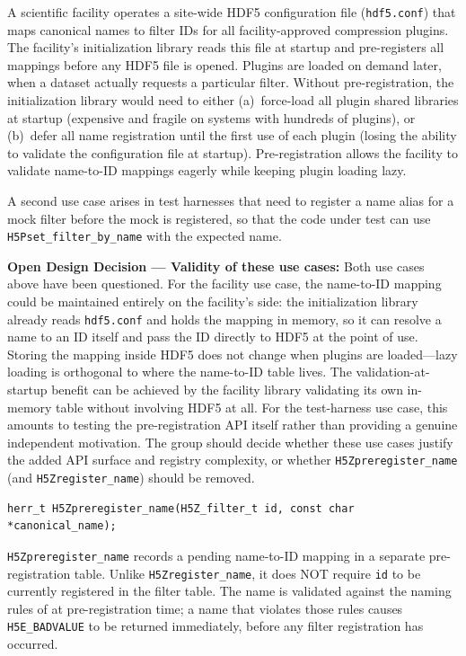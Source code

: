 \documentclass[../HDF5_RFC.tex]{subfiles}
\begin{document}
A scientific facility operates a site-wide HDF5 configuration file
(\texttt{hdf5.conf}) that maps canonical names to filter IDs for all
facility-approved compression plugins. The facility's initialization library
reads this file at startup and pre-registers all mappings before any HDF5 file
is opened. Plugins are loaded on demand later, when a dataset actually
requests a particular filter. Without pre-registration, the initialization
library would need to either (a)~force-load all plugin shared libraries at
startup (expensive and fragile on systems with hundreds of plugins), or
(b)~defer all name registration until the first use of each plugin (losing the
ability to validate the configuration file at startup). Pre-registration
allows the facility to validate name-to-ID mappings eagerly while keeping
plugin loading lazy.

A second use case arises in test harnesses that need to register a name alias
for a mock filter before the mock is registered, so that the code under test
can use \texttt{H5Pset\_filter\_by\_name} with the expected name.

\noindent\colorbox{yellow!25}{\parbox{\dimexpr\linewidth-2\fboxsep}{%
  \textbf{Open Design Decision --- Validity of these use cases:}
  Both use cases above have been questioned.  For the facility use case, the
  name-to-ID mapping could be maintained entirely on the facility's side:
  the initialization library already reads \texttt{hdf5.conf} and holds the
  mapping in memory, so it can resolve a name to an ID itself and pass the
  ID directly to HDF5 at the point of use.  Storing the mapping inside HDF5
  does not change when plugins are loaded---lazy loading is orthogonal to
  where the name-to-ID table lives.  The validation-at-startup benefit can be
  achieved by the facility library validating its own in-memory table without
  involving HDF5 at all.  For the test-harness use case, this amounts to
  testing the pre-registration API itself rather than providing a genuine
  independent motivation.  The group should decide whether these use cases
  justify the added API surface and registry complexity, or whether
  \texttt{H5Zpreregister\_name} (and \texttt{H5Zregister\_name}) should be removed.
}}

\begin{verbatim}
herr_t H5Zpreregister_name(H5Z_filter_t id, const char *canonical_name);
\end{verbatim}

\texttt{H5Zpreregister\_name} records a pending name-to-ID mapping in a separate
pre-registration table. Unlike \texttt{H5Zregister\_name}, it does NOT require
\texttt{id} to be currently registered in the filter table. The name is validated
against the naming rules of  at pre-registration
time; a name that violates those rules causes \texttt{H5E\_BADVALUE} to be returned
immediately, before any filter registration has occurred.
\end{document}
